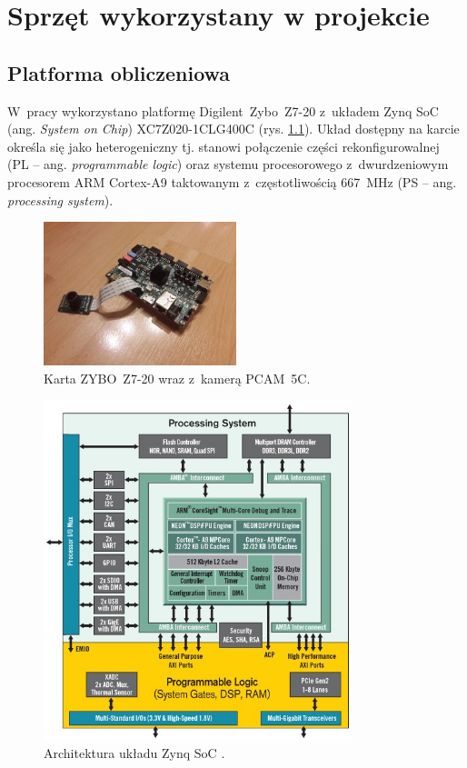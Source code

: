 \chapter{Sprzęt wykorzystany w projekcie}
\label{cha:sprzet}


\section{Platforma obliczeniowa}
\label{sec:platforma_obliczeniowa}

W~pracy wykorzystano platformę Digilent~Zybo~Z7-20 z~układem Zynq SoC (ang. \textit{System on Chip}) XC7Z020-1CLG400C (rys. \ref{fig:plytka_kamera}). 
Układ dostępny na karcie określa się jako heterogeniczny tj. stanowi połączenie części rekonfigurowalnej (PL -- ang. \textit{programmable logic}) oraz systemu procesorowego z~dwurdzeniowym procesorem ARM Cortex-A9 taktowanym z~częstotliwością 667~MHz (PS -- ang. \textit{processing system}).
\begin{figure}[h]
	\centering
	\includegraphics[width=0.5\textwidth]{plytka_kamera.jpg}
	\caption{Karta ZYBO~Z7-20 wraz z~kamerą PCAM~5C.}
	\label{fig:plytka_kamera}
\end{figure}
\begin{figure}[h]
	\centering
	\includegraphics[width=0.8\textwidth]{zynq.png}
	\caption{Architektura układu Zynq SoC \cite{zynq}.}
	\label{fig:zynq}
\end{figure}
